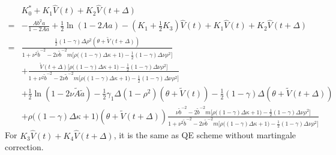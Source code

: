 \documentclass{ws-ijfe}
\begin{document}
\begin{equation*}
  \begin{split}
    &K_0^*+K_1\hat{V}(t)+K_2\hat{V}(t+\Delta)\\
    =&-\frac{Ab^2a}{1-2Aa}+\frac{1}{2}\ln(1-2Aa)-(K_1+\frac{1}{2}K_3)\hat{V}(t)+K_1\hat{V}(t)+K_2\hat{V}(t+\Delta)\\
  =&\frac{\frac{1}{2}(1-\gamma)\Delta\rho^2(\theta+\tilde{V}(t+\Delta))}{1+\nu^2\tilde{b}^{-2}-2\nu\tilde{b}^{-2}m\big[\rho\big((1-\gamma)\Delta\kappa+1\big)-\frac{1}{2}(1-\gamma)\Delta\nu\rho^2\big]}\\
  &+\frac{\mathring{V}(t+\Delta)\big[\rho\big((1-\gamma)\Delta\kappa+1\big)-\frac{1}{2}(1-\gamma)\Delta\nu\rho^2\big]}{1+\nu^2\tilde{b}^{-2}-2\nu\tilde{b}^{-2}m\big[\rho\big((1-\gamma)\Delta\kappa+1\big)-\frac{1}{2}(1-\gamma)\Delta\nu\rho^2\big]}\\
  &+\frac{1}{2}\ln(1-2\nu\tilde{A}\tilde{a})-\frac{1}{2}\gamma_1\Delta(1-\rho^2)(\theta+\tilde{V}(t))-\frac{1}{2}(1-\gamma)\Delta(\theta+\tilde{V}(t+\Delta))\\
  &+\rho\big((1-\gamma)\Delta\kappa+1\big)(\theta+\tilde{V}(t+\Delta))\frac{\nu\tilde{b}^{-2}-2\tilde{b}^{-2}m\big[\rho\big((1-\gamma)\Delta\kappa+1\big)-\frac{1}{2}(1-\gamma)\Delta\nu\rho^2\big]}{1+\nu^2\tilde{b}^{-2}-2\nu\tilde{b}^{-2}m\big[\rho\big((1-\gamma)\Delta\kappa+1\big)-\frac{1}{2}(1-\gamma)\Delta\nu\rho^2\big]}
\end{split}
\end{equation*}
For $K_3\hat{V}(t)+K_4\hat{V}(t+\Delta)$, it is the same as QE scheme without martingale correction.\\
\end{document}

